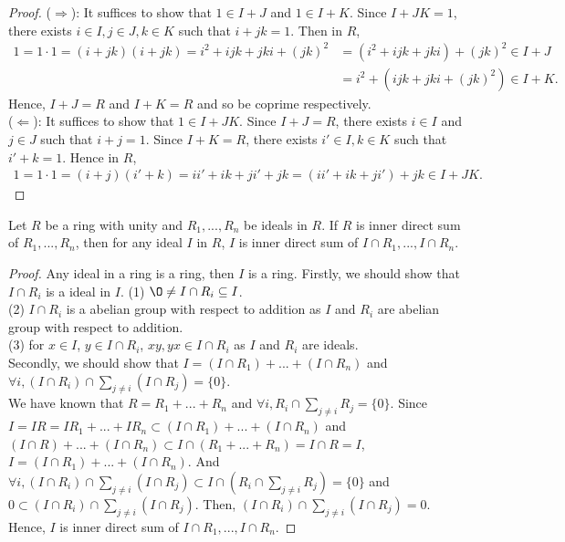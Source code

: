 \begin{proof}
    ($\Rightarrow$): It suffices to show that $1\in I+J$ and $1\in I+K$.
    Since $I+JK=1$, there exists $i\in I,j\in J,k\in K$ such that $i+jk=1$.
    Then in $R$,
    \begin{align*}
        1=1\cdot 1 = (i+jk)(i+jk)=i^2+ijk+jki+(jk)^2&=(i^2+ijk+jki)+(jk)^2\in I+J\\
                                                    &= i^2 + (ijk+jki+(jk)^2)\in I+K.
    \end{align*}
    Hence, $I+J=R$ and $I+K=R$ and so be coprime respectively.\\
    ($\Leftarrow$):
    It suffices to show that $1\in I+JK$. Since $I+J=R$, there exists $i\in I$ and $j\in J$
    such that $i+j=1$. Since $I+K=R$, there exists $i'\in I, k\in K$ such that $i'+k=1$.
    Hence in $R$,
    \begin{align*}
        1=1\cdot 1=(i+j)(i'+k)=ii'+ik+ji'+jk=(ii'+ik+ji')+jk\in I+JK.
    \end{align*}
\end{proof}

\begin{exercise}{}{}
    Let $R$ be a ring with unity and $R_1,...,R_n$ be ideals in $R$. 
    If $R$ is inner direct sum of $R_1,...,R_n$, then for any ideal $I$ in $R$, 
    $I$ is inner direct sum of $I\cap R_1,...,I\cap R_n$.
\end{exercise}
\begin{proof}
    Any ideal in a ring is a ring, then $I$ is a ring.
    Firstly, we should show that $I\cap R_i$ is a ideal in $I$.
    (1) $\O\neq I \cap R_i\subseteq I$. \\
    (2) $I\cap R_i$ is a abelian group with respect to addition as $I$ and $R_i$ are abelian group with respect to addition.\\
    (3) for $x\in I$, $y\in I\cap R_i$, $xy,yx\in I\cap R_i$ as $I$ and $R_i$ are ideals.\\
    Secondly, we should show that $I=(I\cap R_1)+...+(I\cap R_n)$ and $\forall i, (I\cap R_i)\cap \sum\limits_{j\neq i}(I\cap R_j)=\{0\}$.\\
    We have known that $R=R_1+...+R_n$ and $\forall i, R_i\cap \sum\limits_{j\neq i}R_j=\{0\}$. 
    Since $I=IR=IR_1+...+IR_n\subset (I\cap R_1)+...+(I\cap R_n)$ and $(I\cap R)+...+(I\cap R_n)\subset I\cap (R_1+...+R_n)=I\cap R=I$,
    $I=(I\cap R_1)+...+(I\cap R_n)$.
    And $\forall i, (I\cap R_i)\cap \sum\limits_{j\neq i}(I\cap R_j)\subset I\cap (R_i\cap \sum\limits_{j\neq i}{R_j})=\{0\}$ and ${0}\subset (I\cap R_i)\cap \sum\limits_{j\neq i}(I\cap R_j)$.
    Then, $(I\cap R_i)\cap \sum\limits_{j\neq i}(I\cap R_j)={0}$.
    Hence, $I$ is inner direct sum of $I\cap R_1,...,I\cap R_n$.
\end{proof}


